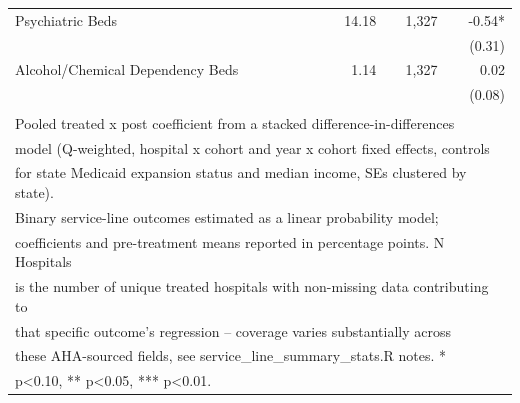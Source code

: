 \begin{table}[!h]
\begin{tabular}[t]{lrrr}
\hspace{1em}Psychiatric Beds & 14.18 & 1,327 & -0.54*\\
\hspace{1em} &  &  & (0.31)\\
\hspace{1em}Alcohol/Chemical Dependency Beds & 1.14 & 1,327 & 0.02\\
\hspace{1em} &  &  & (0.08)\\
\bottomrule
\multicolumn{4}{l}{\textsuperscript{} Pooled treated x post coefficient from a stacked difference-in-differences}\\
\multicolumn{4}{l}{model (Q-weighted, hospital x cohort and year x cohort fixed effects, controls}\\
\multicolumn{4}{l}{for state Medicaid expansion status and median income, SEs clustered by state).}\\
\multicolumn{4}{l}{Binary service-line outcomes estimated as a linear probability model;}\\
\multicolumn{4}{l}{coefficients and pre-treatment means reported in percentage points. N Hospitals}\\
\multicolumn{4}{l}{is the number of unique treated hospitals with non-missing data contributing to}\\
\multicolumn{4}{l}{that specific outcome's regression -- coverage varies substantially across}\\
\multicolumn{4}{l}{these AHA-sourced fields, see service\_line\_summary\_stats.R notes. *}\\
\multicolumn{4}{l}{p<0.10, ** p<0.05, *** p<0.01.}\\
\end{tabular}
\end{table}
